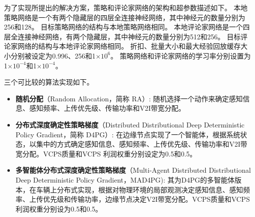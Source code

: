 为了实现所提出的解决方案，策略和评论家网络的架构和超参数描述如下。
本地策略网络是一个有两个隐藏层的四层全连接神经网络，其中神经元的数量分别为256和128。
目标策略网络的结构与本地策略网络相同。
本地评论家网络是一个四层全连接神经网络，有两个隐藏层，其中神经元的数量分别为512和256。
目标评论家网络的结构与本地评论家网络相同。
折扣、批量大小和最大经验回放缓存大小分别被设定为0.996、256和1$\times10^{6}$。
策略网络和评论家网络的学习率分别设置为1$\times10^{-4}$和1$\times10^{-4}$。

三个可比较的算法实现如下。
\begin{itemize}
	\item \textbf{随机分配}（Random Allocation，简称 RA）: 随机选择一个动作来确定感知信息、感知频率、上传优先级、传输功率和V2I带宽分配。
	\item \textbf{分布式深度确定性策略梯度}（Distributed Distributional Deep Deterministic Policy Gradient，简称 D4PG）\cite{barth2018distributed}: 在边缘节点实现了一个智能体，根据系统状态，以集中的方式确定感知信息、感知频率、上传优先级、传输功率和V2I带宽分配。VCPS质量和VCPS 利润权重分别设定为0.5和0.5。
	\item \textbf{多智能体分布式深度确定性策略梯度}（Multi-Agent Distributed Distributional Deep Deterministic Policy Gradient，MAD4PG): 其为D4PG的多智能体版本，在车辆上分布式实现，根据对物理环境的局部观测决定感知信息、感知频率、上传优先级和传输功率，边缘节点决定V2I带宽分配。VCPS质量和VCPS 利润权重分别设为0.5和0.5。
\end{itemize}

